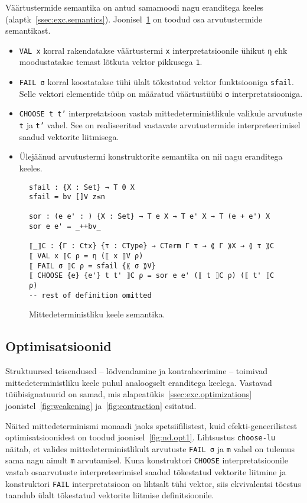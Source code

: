 \documentclass[a4paper,12pt]{article}
\begin{document}
Väärtustermide semantika on antud samamoodi nagu eranditega keeles (alaptk~\ref{ssec:exc.semantics}).
Joonisel~\ref{fig:nd.semantics} on toodud osa arvutustermide semantikast.
\begin{itemize}
\item {\tt VAL x} korral rakendatakse väärtustermi {\tt x} interpretatsioonile ühikut {\tt η} ehk moodustatakse temast lõtkuta vektor pikkusega {\tt 1}.
\item {\tt FAIL σ} korral koostatakse tühi ülalt tõkestatud vektor funktsiooniga {\tt sfail}. Selle vektori elementide tüüp on määratud väärtustüübi {\tt σ} interpretatsiooniga.
\item {\tt CHOOSE t t'} interpretatsioon vastab mittedeterministlikule valikule arvutuste {\tt t} ja {\tt t'} vahel. See on realiseeritud vastavate arvutustermide interpreteerimisel saadud vektorite liitmisega.
\item Ülejäänud arvutustermi konstruktorite semantika on nii nagu eranditega keeles.
\end{itemize}
\begin{figure}
  \begin{BVerbatim}
sfail : {X : Set} → T 0 X
sfail = bv []V z≤n

sor : (e e' : ) {X : Set} → T e X → T e' X → T (e + e') X
sor e e' = _++bv_

⟦_⟧C : {Γ : Ctx} {τ : CType} → CTerm Γ τ → ⟪ Γ ⟫X → ⟪ τ ⟫C
⟦ VAL x ⟧C ρ = η (⟦ x ⟧V ρ)
⟦ FAIL σ ⟧C ρ = sfail {⟪ σ ⟫V}
⟦ CHOOSE {e} {e'} t t' ⟧C ρ = sor e e' (⟦ t ⟧C ρ) (⟦ t' ⟧C ρ)
-- rest of definition omitted
  \end{BVerbatim}
  \caption{Mittedeterministliku keele semantika.}
  \label{fig:nd.semantics}
\end{figure}

\subsection{Optimisatsioonid}

Struktuursed teisendused -- lõdvendamine ja kontraheerimine -- toimivad mittedeterministliku keele puhul analoogselt eranditega keelega. Vastavad tüübisignatuurid on samad, mis alapeatükis~\ref{ssec:exc.optimizations} joonistel~\ref{fig:weakening} ja~\ref{fig:contraction} esitatud.

Näited mittedeterminismi monaadi jaoks spetsiifilistest, kuid efekti-geneerilistest optimisatsioonidest on toodud joonisel~\ref{fig:nd.opt1}.
Lihtsustus {\tt choose-lu} näitab, et valides mittedeterministlikult arvutuste {\tt FAIL σ} ja {\tt m} vahel on tulemus sama nagu ainult {\tt m} arvutamisel. Kuna konstruktori {\tt CHOOSE} interpretatsioonile vastab osaarvutuste interpreteerimisel saadud tõkestatud vektorite liitmine ja konstruktori {\tt FAIL} interpretatsioon on lihtsalt tühi vektor, siis ekvivalentsi tõestus taandub ülalt tõkestatud vektorite liitmise definitsioonile.
\end{document}

